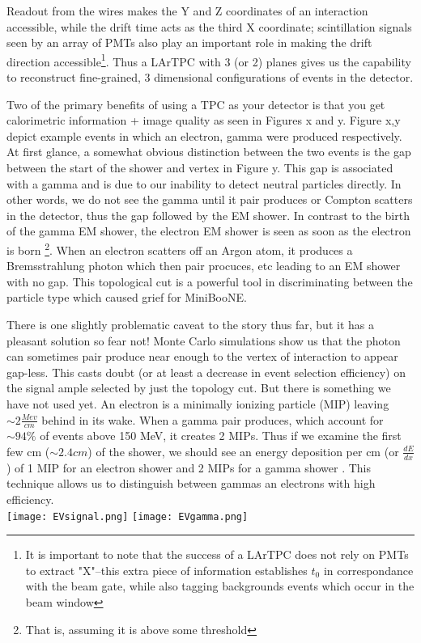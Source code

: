 \documentclass[12pt]{article}
\begin{document}
Readout from the wires makes the Y and Z coordinates of an interaction accessible, while the drift time acts as the third X coordinate; scintillation signals seen by an array of PMTs also play an important role in making the drift direction accessible\footnote{It is important to note that the success of a LArTPC does not rely on PMTs to extract "X"--this extra piece of information establishes $t_0$ in correspondance with the beam gate, while also tagging backgrounds events which occur in the beam window}.  Thus a LArTPC with 3 (or 2) planes gives us the capability to reconstruct fine-grained, 3 dimensional configurations of events in the detector. \vspace{4 mm}
\par Two of the primary benefits of using a TPC as your detector is that you get calorimetric information + image quality as seen in Figures x and y.  Figure x,y depict example events in which an electron, gamma were produced respectively. At first glance, a somewhat obvious distinction between the two events is the gap between the start of the shower and vertex in Figure y.  This gap is associated with a gamma and is due to our inability to detect neutral particles directly. In other words, we do not see the gamma until it pair produces or Compton scatters in the detector, thus the gap followed by the EM shower. In contrast to the birth of the gamma EM shower, the electron EM shower is seen as soon as the electron is born \footnote{That is, assuming it is above some threshold}.  When an electron scatters off an Argon atom, it produces a Bremsstrahlung photon which then pair procuces, etc leading to an EM shower with no gap. This topological cut is a powerful tool in discriminating between the particle type which caused grief for MiniBooNE. 
\vspace{4 mm} \par There is one slightly problematic caveat to the story thus far, but it has a pleasant solution so fear not! Monte Carlo simulations show us that the photon can sometimes pair produce near enough to the vertex of interaction to appear gap-less. This casts doubt (or at least a decrease in event selection efficiency) on the signal ample selected by just the topology cut. But there is something we have not used yet.  An electron is a minimally ionizing particle (MIP) leaving $\sim 2 \frac{Mev}{cm}$ behind in its wake. When a gamma pair produces, which account for $\sim 94\%$ of events above 150 MeV, it creates 2 MIPs.  Thus if we examine the first few cm ($\sim 2.4cm$) of the shower, we should see an energy deposition per cm (or $\frac{dE}{dx}$) of 1 MIP for an electron shower and 2 MIPs for a gamma shower \cite{szelc}. This technique allows us to distinguish between gammas an electrons with high efficiency.    
\\\texttt{[image: EVsignal.png]}
\hspace{2 mm}
\texttt{[image: EVgamma.png]}
\end{document}
